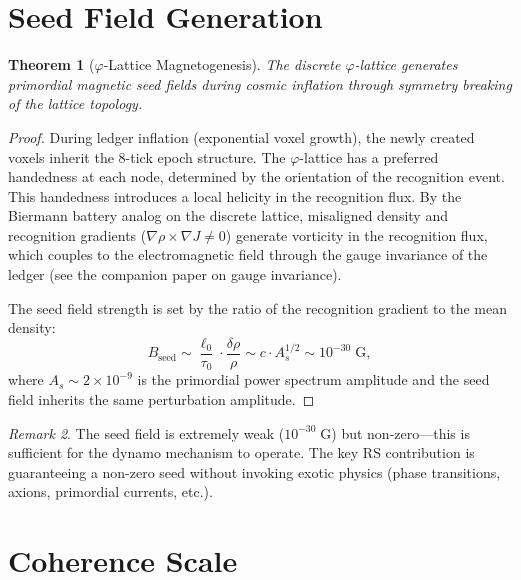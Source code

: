 \documentclass[12pt,a4paper]{article}
\newtheorem{theorem}{Theorem}[section]
\theoremstyle{definition}
\theoremstyle{remark}
\newtheorem{remark}[theorem]{Remark}
\begin{document}
\section{Seed Field Generation}
\label{sec:seed}

\begin{theorem}[$\varphi$-Lattice Magnetogenesis]
\label{thm:seed}
The discrete $\varphi$-lattice generates primordial magnetic seed
fields during cosmic inflation through symmetry breaking of the
lattice topology.
\end{theorem}

\begin{proof}
During ledger inflation (exponential voxel growth), the newly
created voxels inherit the 8-tick epoch structure.  The $\varphi$-lattice
has a preferred handedness at each node, determined by the
orientation of the recognition event.  This handedness introduces a
local helicity in the recognition flux.  By the Biermann battery
analog on the discrete lattice, misaligned density and recognition
gradients ($\nabla\rho \times \nabla J \neq 0$) generate vorticity
in the recognition flux, which couples to the electromagnetic
field through the gauge invariance of the ledger (see the companion
paper on gauge invariance).

The seed field strength is set by the ratio of the recognition
gradient to the mean density:
\begin{equation}
  B_{\mathrm{seed}} \sim \frac{\ell_0}{\tau_0} \cdot
  \frac{\delta\rho}{\rho} \sim c \cdot A_s^{1/2}
  \sim 10^{-30}\;\mathrm{G},
\end{equation}
where $A_s \sim 2 \times 10^{-9}$ is the primordial power spectrum
amplitude and the seed field inherits the same perturbation
amplitude.
\end{proof}

\begin{remark}
The seed field is extremely weak ($10^{-30}\;\mathrm{G}$) but
non-zero---this is sufficient for the dynamo mechanism to operate.
The key RS contribution is guaranteeing a non-zero seed without
invoking exotic physics (phase transitions, axions, primordial
currents, etc.).
\end{remark}

\section{Coherence Scale}
\label{sec:coherence}
\end{document}
